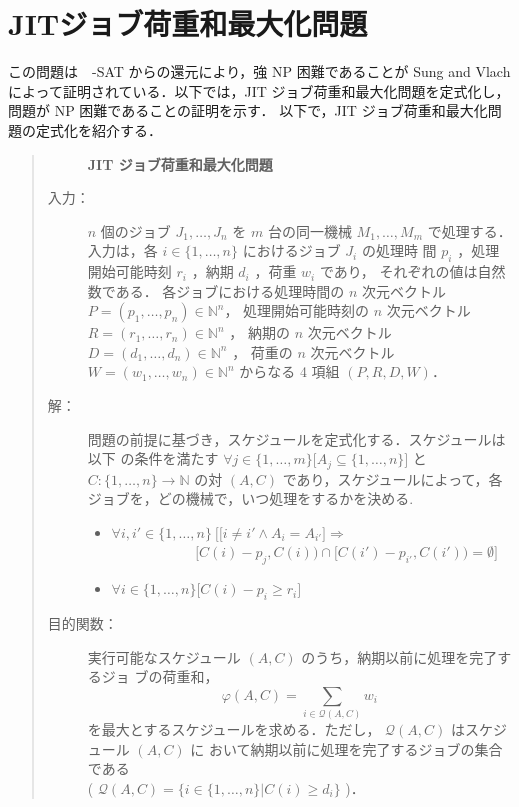 \documentclass[12pt]{optlab-bachelor}
\begin{document}
\section{JITジョブ荷重和最大化問題}\label{3_s_1}
この問題は　{-SAT} からの還元により，強 NP 困難であることが Sung and Vlach \cite{SJIT} によって証明されている．以下では，JIT ジョブ荷重和最大化問題を定式化し，問題が NP 困難であることの証明を示す．
以下で，JIT ジョブ荷重和最大化問題の定式化を紹介する．
\begin{quote}
  \begin{description}
    \item[] {\bf JIT ジョブ荷重和最大化問題}
    \item[入力：] $n$ 個のジョブ $J_1,\ldots,J_n$ を $m$ 台の同一機械 $M_1,\ldots,M_m$
    で処理する．入力は，各 $i \in \{1,\ldots,n\}$ におけるジョブ $J_i$ の処理時
    間 $p_i$ ，処理開始可能時刻 $r_i$ ，納期 $d_i$ ，荷重 $w_i$ であり，
    それぞれの値は自然数である．
    各ジョブにおける処理時間の $n$ 次元ベクトル $P = (p_1,\ldots,p_n) \in \mathbb{N}^n$，
    処理開始可能時刻の $n$ 次元ベクトル $R = (r_1,\ldots,r_n) \in \mathbb{N}^n$ ，
    納期の $n$ 次元ベクトル $D = (d_1,\ldots,d_n) \in \mathbb{N}^n$ ，
    荷重の $n$ 次元ベクトル $W = (w_1,\ldots,w_n) \in \mathbb{N}^n$ からなる 4 項組 $(P,R,D,W)$．
    \item[解：] 問題の前提に基づき，スケジュールを定式化する．スケジュールは以下
    の条件を満たす $\forall j \in \{1,\ldots,m\}\big[A_j \subseteq
    \{1,\ldots,n\}\big]$ と $C : \{1,\ldots,n\} \to \mathbb{N}$ の対 $(A,
    C)$ であり，スケジュールによって，各ジョブを，どの機械で，いつ処理をするかを決める.
    \begin{itemize}
      \item $\forall i, i' \in \{1,\ldots,n\}\ \Big[ \big[i \neq i' \land A_i = A_{i'}\big] \Rightarrow$ \\ $~~~~~~~~~~~~~~~~~~~~~~~~~~~[C(i) - p_j, C(i)) \cap [C(i') - p_{i'}, C(i')) = \emptyset \Big]$
      \item  $\forall i \in \{1,\ldots,n\}\big[C(i) - p_i \ge r_i\big]$
    \end{itemize}
    \item[目的関数：] 実行可能なスケジュール $(A, C)$ のうち，納期以前に処理を完了するジョ
    ブの荷重和，
    \begin{displaymath}
      \displaystyle \varphi(A,C) = \sum_{i \in \mathcal{Q}(A,C)}w_i
    \end{displaymath}
    を最大とするスケジュールを求める．ただし，
    $\mathcal{Q}(A, C)$ はスケジュール $(A, C)$ に
    おいて納期以前に処理を完了するジョブの集合である\\
    ( $\mathcal{Q}(A, C) = \{i \in \{1,\ldots, n\} | C(i) \ge d_i \}$ )．
  \end{description}
\end{quote}
\end{document}
